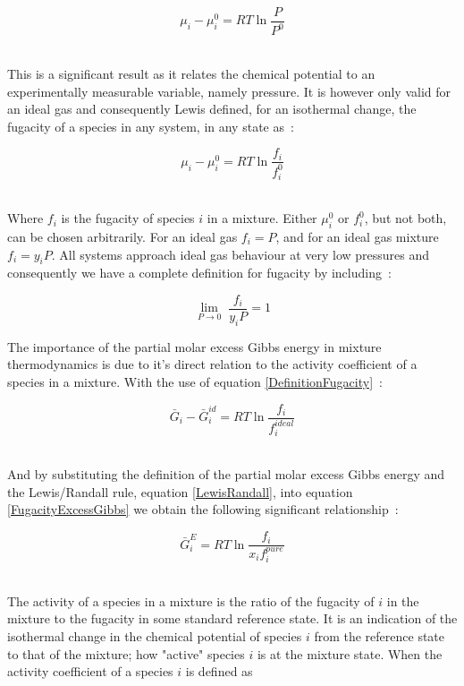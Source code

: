 \begin{equation}
\mu_{i} - \mu^{0}_{i} = RT \ln \frac{P}{P^{0}}
\end{equation}\

This is a significant result as it relates the chemical potential to an experimentally measurable variable, namely pressure. It is however only valid for an ideal gas and consequently Lewis defined, for an isothermal change, the fugacity of a species in any system, in any state as~\cite{MolecularThermodynamicsOfFluidPhaseEquilibria}:\

\begin{equation}
\mu_{i} - \mu^{0}_{i} = RT \ln \frac{f_{i}}{f^{0}_{i}} \label{DefinitionFugacity}
\end{equation}\

Where $f_{i}$ is the fugacity of species $i$ in a mixture. Either $\mu_{i}^{0}$ or $f_{i}^{0}$, but not both, can be chosen arbitrarily. For an ideal gas $f_{i} = P$, and for an ideal gas mixture $f_{i} = y_{i}P$. All systems approach ideal gas behaviour at very low pressures and consequently we have a complete definition for fugacity by including~\cite{MolecularThermodynamicsOfFluidPhaseEquilibria, SmithNessAbbott}:\

\begin{equation}
\lim_{P\rightarrow 0} \;\frac{f_{i}}{y_{i}P} =1
\end{equation}

The importance of the partial molar excess Gibbs energy in mixture thermodynamics is due to it's direct relation to the activity coefficient of a species in a mixture. With the use of equation \ref{DefinitionFugacity}~\cite{MolecularThermodynamicsOfFluidPhaseEquilibria}:\

\begin{equation}
\bar{G}_{i} - \bar{G}_{i}^{id} = RT \ln \frac{f_{i}}{f_{i}^{ideal}} \label{FugacityExcessGibbs}
\end{equation} \

And by substituting the definition of the partial molar excess Gibbs energy and the Lewis/Randall rule, equation \ref{LewisRandall}, into equation \ref{FugacityExcessGibbs} we obtain the following significant relationship~\cite{MolecularThermodynamicsOfFluidPhaseEquilibria}:\

\begin{equation}
\bar{G}_{i}^{E}  = RT \ln \frac{f_{i}}{x_{i}f_{i}^{pure}}
\end{equation}\

The activity of a species in a mixture is the ratio of the fugacity of $i$ in the mixture to the fugacity in some standard reference state. It is an indication of the isothermal change in the chemical potential of species $i$ from the reference state to that of the mixture; how "active" species $i$ is at the mixture state. When the activity coefficient of a species $i$ is defined as\

